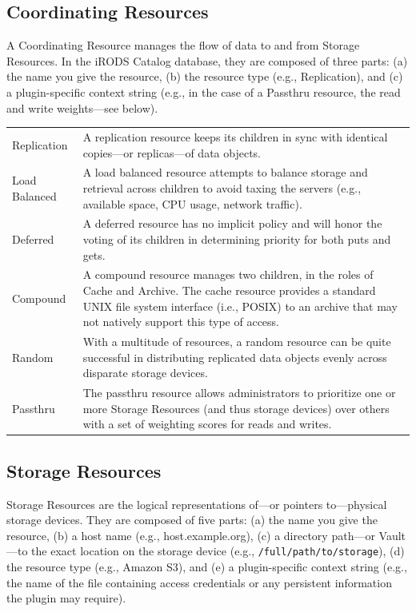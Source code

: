 \documentclass[10pt,oneside]{memoir}
\begin{document}
\subsection{Coordinating Resources}
\label{sec:coordinating_resources}

A Coordinating Resource manages the flow of data to and from Storage Resources. In the iRODS Catalog database, they are composed of three parts: (a) the name you give the resource, (b) the resource type (e.g., Replication), and (c) a plugin-specific context string (e.g., in the case of a Passthru resource, the read and write weights---see below).

\begin{center}
\def\arraystretch{1.5}%
\begin{tabular}{ |l|p{10cm}| }
\hline
Replication & A replication resource keeps its children in sync with identical copies---or replicas---of data objects. \\
Load Balanced & A load balanced resource attempts to balance storage and retrieval across children to avoid taxing the servers (e.g., available space, CPU usage, network traffic). \\
Deferred & A deferred resource has no implicit policy and will honor the voting of its children in determining priority for both puts and gets. \\
Compound & A compound resource manages two children, in the roles of Cache and Archive. The cache resource provides a standard UNIX file system interface (i.e., POSIX) to an archive that may not natively support this type of access. \\
Random & With a multitude of resources, a random resource can be quite successful in distributing replicated data objects evenly across disparate storage devices. \\
Passthru & The passthru resource allows administrators to prioritize one or more Storage Resources (and thus storage devices) over others with a set of weighting scores for reads and writes. \\
\hline
\end{tabular}
\end{center}

\subsection{Storage Resources}

Storage Resources are the logical representations of---or pointers to---physical storage devices. They are composed of five parts: (a) the name you give the resource, (b) a host name (e.g., host.example.org), (c) a directory path---or Vault---to the exact location on the storage device (e.g., \texttt{/full/path/to/storage}), (d) the resource type (e.g., Amazon S3), and (e) a plugin-specific context string (e.g., the name of the file containing access credentials or any persistent information the plugin may require).
\end{document}
